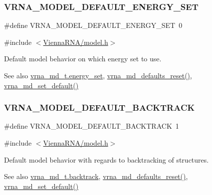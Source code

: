 \subsubsection{\texorpdfstring{VRNA\_MODEL\_DEFAULT\_ENERGY\_SET}{VRNA\_MODEL\_DEFAULT\_ENERGY\_SET}}
{\footnotesize\ttfamily \#define V\+R\+N\+A\+\_\+\+M\+O\+D\+E\+L\+\_\+\+D\+E\+F\+A\+U\+L\+T\+\_\+\+E\+N\+E\+R\+G\+Y\+\_\+\+S\+ET~0}



{\ttfamily \#include $<$\mbox{\hyperlink{model_8h}{Vienna\+R\+N\+A/model.\+h}}$>$}



Default model behavior on which energy set to use. 

\begin{DoxySeeAlso}{See also}
\mbox{\hyperlink{group__model__details_a5eee4e3b468eb690d1407e0178dafb3f}{vrna\+\_\+md\+\_\+t.\+energy\+\_\+set}}, \mbox{\hyperlink{group__model__details_ga70834424cf804d149937de89f80ceb45}{vrna\+\_\+md\+\_\+defaults\+\_\+reset()}}, \mbox{\hyperlink{group__model__details_ga8ac6ff84936282436f822644bf841f66}{vrna\+\_\+md\+\_\+set\+\_\+default()}} 
\end{DoxySeeAlso}
\mbox{\label{group__model__details_ga3fda8006ab84baf817bd8e5ccbc6bb35}} 
\subsubsection{\texorpdfstring{VRNA\_MODEL\_DEFAULT\_BACKTRACK}{VRNA\_MODEL\_DEFAULT\_BACKTRACK}}
{\footnotesize\ttfamily \#define V\+R\+N\+A\+\_\+\+M\+O\+D\+E\+L\+\_\+\+D\+E\+F\+A\+U\+L\+T\+\_\+\+B\+A\+C\+K\+T\+R\+A\+CK~1}



{\ttfamily \#include $<$\mbox{\hyperlink{model_8h}{Vienna\+R\+N\+A/model.\+h}}$>$}



Default model behavior with regards to backtracking of structures. 

\begin{DoxySeeAlso}{See also}
\mbox{\hyperlink{group__model__details_a31f4471608cbdd03887f63c281823adb}{vrna\+\_\+md\+\_\+t.\+backtrack}}, \mbox{\hyperlink{group__model__details_ga70834424cf804d149937de89f80ceb45}{vrna\+\_\+md\+\_\+defaults\+\_\+reset()}}, \mbox{\hyperlink{group__model__details_ga8ac6ff84936282436f822644bf841f66}{vrna\+\_\+md\+\_\+set\+\_\+default()}} 
\end{DoxySeeAlso}
\mbox{\label{group__model__details_gad0e81fcaca53c4a826c68e0796de2afb}} 
